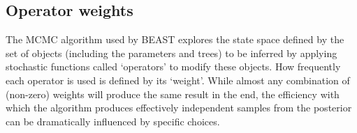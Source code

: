 \documentclass[a4paper,11pt]{article}
\begin{document}
%
%
%
%
%
%
%

\subsection{Operator weights}

The MCMC algorithm used by BEAST explores the state space defined by the set of
objects (including the parameters and trees) to be inferred by applying
stochastic functions called `operators' to modify these objects. How frequently
each operator is used is defined by its `weight'. While almost any combination of (non-zero) weights will produce the same result in the end, the efficiency with which the algorithm produces effectively independent samples from the posterior can be dramatically influenced by specific choices.
\end{document}
